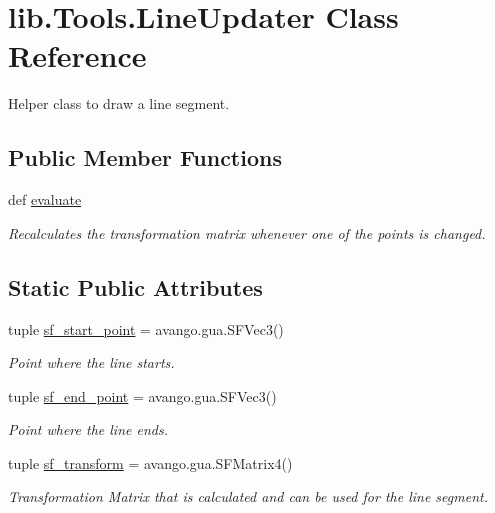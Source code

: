 \hypertarget{classlib_1_1Tools_1_1LineUpdater}{\section{lib.\-Tools.\-Line\-Updater \-Class \-Reference}
\label{classlib_1_1Tools_1_1LineUpdater}
}


\-Helper class to draw a line segment.  


\subsection*{\-Public \-Member \-Functions}
\begin{DoxyCompactItemize}
\item 
def \hyperlink{classlib_1_1Tools_1_1LineUpdater_a631a3175fc15ad5e8c94cc47686afd76}{evaluate}
\begin{DoxyCompactList}\small\item\em \-Recalculates the transformation matrix whenever one of the points is changed. \end{DoxyCompactList}\end{DoxyCompactItemize}
\subsection*{\-Static \-Public \-Attributes}
\begin{DoxyCompactItemize}
\item 
tuple \hyperlink{classlib_1_1Tools_1_1LineUpdater_a514cb8e64b3e9914708549ab7dee3696}{sf\-\_\-start\-\_\-point} = avango.\-gua.\-S\-F\-Vec3()
\begin{DoxyCompactList}\small\item\em \-Point where the line starts. \end{DoxyCompactList}\item 
tuple \hyperlink{classlib_1_1Tools_1_1LineUpdater_a0a94ee726a3eb903e8603d01c7a6a287}{sf\-\_\-end\-\_\-point} = avango.\-gua.\-S\-F\-Vec3()
\begin{DoxyCompactList}\small\item\em \-Point where the line ends. \end{DoxyCompactList}\item 
tuple \hyperlink{classlib_1_1Tools_1_1LineUpdater_a6ca40aac2ab18d99273a344f3627ea86}{sf\-\_\-transform} = avango.\-gua.\-S\-F\-Matrix4()
\begin{DoxyCompactList}\small\item\em \-Transformation \-Matrix that is calculated and can be used for the line segment. \end{DoxyCompactList}\end{DoxyCompactItemize}


